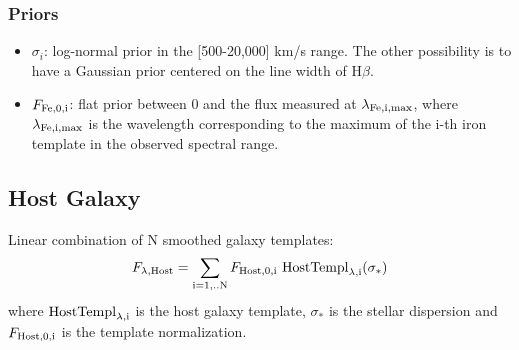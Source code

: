 \documentclass[12pt,letterpaper]{article}
\newcommand{\Hbeta}{\ifmmode {\rm H}\beta \else H$\beta$\fi}
\begin{document}
\subsubsection*{Priors}
\begin{itemize}
    \item {\tt $\sigma_i$}: log-normal prior in the [500-20,000] km/s range. The other possibility is to have a Gaussian prior centered on the line width of \Hbeta.
    \item {\tt $F_{\rm Fe,0,i}$}: flat prior between 0 and the flux measured at $\lambda_{\rm Fe,i,max}$, where $\lambda_{\rm Fe,i,max}$ is the wavelength 
      corresponding to the maximum of the i-th iron template in the observed spectral range.
\end{itemize}

\subsection*{Host Galaxy}
Linear combination of N smoothed galaxy templates:
\begin{equation}
F_{\lambda {\rm{,Host}}} = \sum_{\rm i=1,..N} F_{\rm{Host,0,i}} \  {\rm HostTempl}_{\rm{\lambda,i}}(\sigma_*) 
\end{equation}
where ${\rm HostTempl}_{\rm{\lambda,i}}$ is the host galaxy template,
$\sigma_*$ is the stellar dispersion and $F_{\rm Host,0,i}$ is the
template normalization.\\
\end{document}
